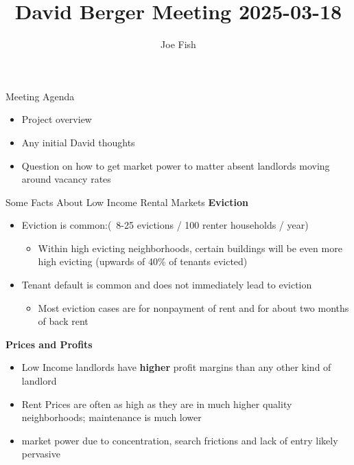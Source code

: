 \documentclass[10pt, xcolor=dvipsnames]{beamer}
\date{}
\title[Landlord Responses to Changes in Tenant Protections]{David Berger Meeting 2025-03-18} %
\author[Joe Fish]{Joe Fish}
\begin{document}
\begin{frame}
\titlepage %
\end{frame}

\begin{frame}{Meeting Agenda}
    \begin{itemize}
        \item Project overview
        \item Any initial David thoughts
        \item Question on how to get market power to matter absent landlords moving around vacancy rates
    \end{itemize}
    
\end{frame}

\begin{frame}{Some Facts About Low Income Rental Markets}
\textbf{Eviction}
    \begin{itemize}
        \item Eviction is common:(~8-25 evictions / 100 renter households / year)
        \begin{itemize}
            \item Within high evicting neighborhoods, certain buildings will be even more high evicting (upwards of 40\% of tenants evicted)
        \end{itemize}
        \item Tenant default is common and does not immediately lead to eviction
        \begin{itemize}
            \item Most eviction cases are for nonpayment of rent and for about two months of back rent
        \end{itemize}
    \end{itemize}
\textbf{Prices and Profits}
\begin{itemize}
        \item Low Income landlords have \textbf{higher} profit margins than any other kind of landlord
        \item Rent Prices are often as high as they are in much higher quality neighborhoods; maintenance is much lower 
        \item market power due to concentration, search frictions and lack of entry likely pervasive
\end{itemize}
    
\end{frame}
\end{document}
